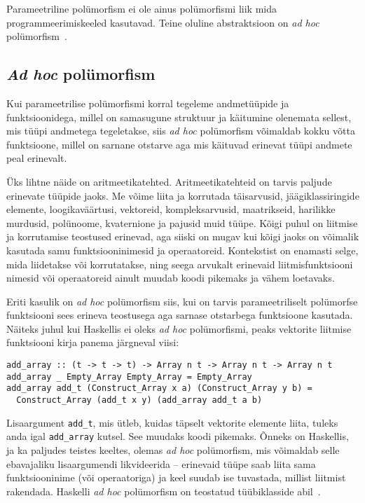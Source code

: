 \documentclass[12pt]{article}
\begin{document}
    Parameetriline polümorfism ei ole ainus polümorfismi liik mida programmeerimiskeeled kasutavad. Teine oluline abstraktsioon on \textit{ad hoc} polümorfism~\cite{Fun}.
    \subsection{\textit{Ad hoc} polümorfism}
      Kui parameetrilise polümorfismi korral tegeleme andmetüüpide ja funktsioonidega, millel on samasugune struktuur ja käitumine olenemata sellest, mis tüüpi andmetega tegeletakse, siis \textit{ad hoc} polümorfism võimaldab kokku võtta funktsioone, millel on sarnane otstarve aga mis käituvad erinevat tüüpi andmete peal erinevalt.

      Üks lihtne näide on aritmeetikatehted. Aritmeetikatehteid on tarvis paljude erinevate tüüpide jaoks. Me võime liita ja korrutada täisarvusid, jäägiklassiringide elemente, loogikaväärtusi, vektoreid, kompleksarvusid, maatrikseid, harilikke murdusid, polünoome, kvaternione ja pajusid muid tüüpe. Kõigi puhul on liitmise ja korrutamise teostused erinevad, aga siiski on mugav kui kõigi jaoks on võimalik kasutada samu funktsiooninimesid ja operaatoreid. Kontekstist on enamasti selge, mida liidetakse või korrutatakse, ning seega arvukalt erinevaid liitmisfunktsiooni nimesid või operaatoreid ainult muudab koodi pikemaks ja vähem loetavaks.

      Eriti kasulik on \textit{ad hoc} polümorfism siis, kui on tarvis parameetriliselt polümorfse funktsiooni sees erineva teostusega aga sarnase otstarbega funktsioone kasutada. Näiteks juhul kui Haskellis ei oleks \textit{ad hoc} polümorfismi, peaks vektorite liitmise funktsiooni kirja panema järgneval viisi:

      \begin{verbatim}add_array :: (t -> t -> t) -> Array n t -> Array n t -> Array n t
add_array _ Empty_Array Empty_Array = Empty_Array
add_array add_t (Construct_Array x a) (Construct_Array y b) =
  Construct_Array (add_t x y) (add_array add_t a b)\end{verbatim}

    Lisaargument \verb!add_t!, mis ütleb, kuidas täpselt vektorite elemente liita, tuleks anda igal \verb!add_array! kutsel. See muudaks koodi pikemaks. Õnneks on Haskellis, ja ka paljudes teistes keeltes, olemas \textit{ad hoc} polümorfism, mis võimaldab selle ebavajaliku lisaargumendi likvideerida -- erinevaid tüüpe saab liita sama funktsiooninime (või operaatoriga) ja keel suudab ise tuvastada, millist liitmist rakendada. Haskelli \textit{ad hoc} polümorfism on teostatud tüübiklasside abil~\cite{How}.
\end{document}

